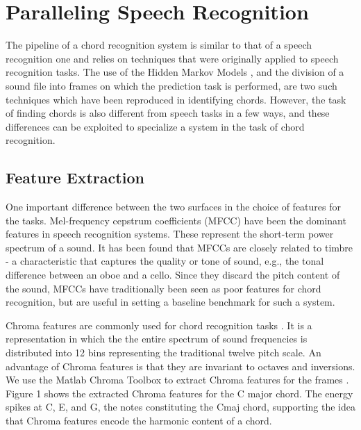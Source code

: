 \documentclass{article}
\begin{document}
\section{Paralleling Speech Recognition}

The pipeline of a chord recognition system is similar to that of a speech
recognition one and relies on techniques that were originally applied to speech
recognition tasks. The use of the Hidden Markov Models \cite{young}, and the
division of a sound file into frames on which the prediction task is performed,
are two such techniques which have been reproduced in identifying chords.
However, the task of finding chords is also different from speech tasks in a few
ways, and these differences can be exploited to specialize a system in the task
of chord recognition.

\subsection{Feature Extraction}

One important difference between the two surfaces in the choice of features for
the tasks. Mel-frequency cepstrum coefficients (MFCC) have been the dominant
features in speech recognition systems. These represent the short-term
power spectrum of a sound. It has been found that MFCCs are closely related to timbre - a characteristic that captures the quality or tone of sound, e.g., the tonal difference between an oboe and a cello. Since they
discard the pitch content of the sound, MFCCs have traditionally been seen as poor features for chord recognition, but are useful in setting a baseline benchmark for such a system.

Chroma features are commonly used for chord recognition tasks \cite{fujishima}.
It is a representation in which the the entire spectrum of sound frequencies is
distributed into 12 bins representing the traditional twelve pitch scale. An
advantage of Chroma features is that they are invariant to octaves and inversions.
We use the Matlab Chroma Toolbox to extract Chroma features for the frames
\cite{muller}. Figure 1 shows the extracted Chroma features for the C major
chord. The energy spikes at C, E, and G, the notes constituting the Cmaj chord,
supporting the idea that Chroma features encode the harmonic content of a chord.
\end{document}
